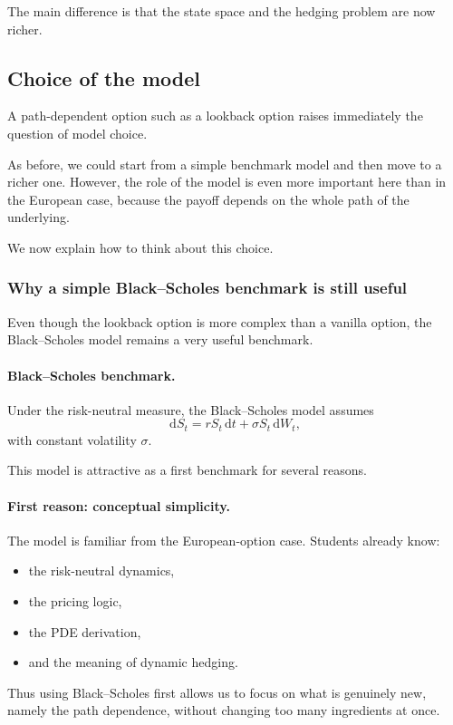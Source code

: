\documentclass[11pt]{article}
\theoremstyle{plain}
\theoremstyle{definition}
\theoremstyle{remark}
\begin{document}
The main difference is that the state space and the hedging problem are
now richer.

\subsection{Choice of the model}

A path-dependent option such as a lookback option raises immediately the
question of model choice.

As before, we could start from a simple benchmark model and then move to
a richer one.
However, the role of the model is even more important here than in the
European case, because the payoff depends on the whole path of the
underlying.

We now explain how to think about this choice.

\subsubsection{Why a simple Black--Scholes benchmark is still useful}

Even though the lookback option is more complex than a vanilla option,
the Black--Scholes model remains a very useful benchmark.

\paragraph{Black--Scholes benchmark.}
Under the risk-neutral measure, the Black--Scholes model assumes
\[
\mathrm{d}S_t=rS_t\,\mathrm{d}t+\sigma S_t\,\mathrm{d}W_t,
\]
with constant volatility \(\sigma\).

This model is attractive as a first benchmark for several reasons.

\paragraph{First reason: conceptual simplicity.}
The model is familiar from the European-option case.
Students already know:
\begin{itemize}[leftmargin=1.4em]
    \item the risk-neutral dynamics,
    \item the pricing logic,
    \item the PDE derivation,
    \item and the meaning of dynamic hedging.
\end{itemize}

Thus using Black--Scholes first allows us to focus on what is genuinely
new, namely the path dependence, without changing too many ingredients
at once.
\end{document}
